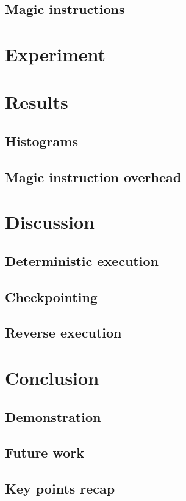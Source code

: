 \documentclass{beamer}
\begin{document}
	\subsection{Magic instructions}
	

	\section{Experiment}

	\section{Results}
	\subsection{Histograms}
	
	\subsection{Magic instruction overhead}
	

	\section{Discussion}
	\subsection{Deterministic execution}
	
	\subsection{Checkpointing}
	
	\subsection{Reverse execution}
	

	\section{Conclusion}
	\subsection{Demonstration}
	
	\subsection{Future work}
	
	\subsection{Key points recap}
	
\end{document}
